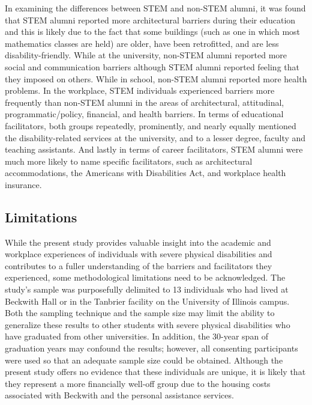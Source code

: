 \documentclass[11.5pt]{sig-alternate} %
\begin{document}
\begin{large}
In examining the differences between STEM and non-STEM alumni, it was found that STEM alumni reported more architectural barriers during their education and this is likely due to the fact that some buildings (such as one in which most mathematics classes are held) are older, have been retrofitted, and are less disability-friendly. While at the university, non-STEM alumni reported more social and communication barriers although STEM alumni reported feeling that they imposed on others. While in school, non-STEM alumni reported more health problems. In the workplace, STEM individuals experienced barriers more frequently than non-STEM alumni in the areas of architectural, attitudinal, programmatic/policy, financial, and health barriers. In terms of educational facilitators, both groups repeatedly, prominently, and nearly equally mentioned the disability-related services at the university, and to a lesser degree, faculty and teaching assistants. And lastly in terms of career facilitators, STEM alumni were much more likely to name specific facilitators, such as architectural accommodations, the Americans with Disabilities Act, and workplace health insurance.

\subsection*{Limitations}
While the present study provides valuable insight into the academic and workplace experiences of individuals with severe physical disabilities and contributes to a fuller understanding of the barriers and facilitators they experienced, some methodological limitations need to be acknowledged. The study's sample was purposefully delimited to 13 individuals who had lived at Beckwith Hall or in the Tanbrier facility on the University of Illinois campus. Both the sampling technique and the sample size may limit the ability to generalize these results to other students with severe physical disabilities who have graduated from other universities. In addition, the 30-year span of graduation years may confound the results; however, all consenting participants were used so that an adequate sample size could be obtained. Although the present study offers no evidence that these individuals are unique, it is likely that they represent a more financially well-off group due to the housing costs associated with Beckwith and the personal assistance services. 


\end{large}
\end{document}
